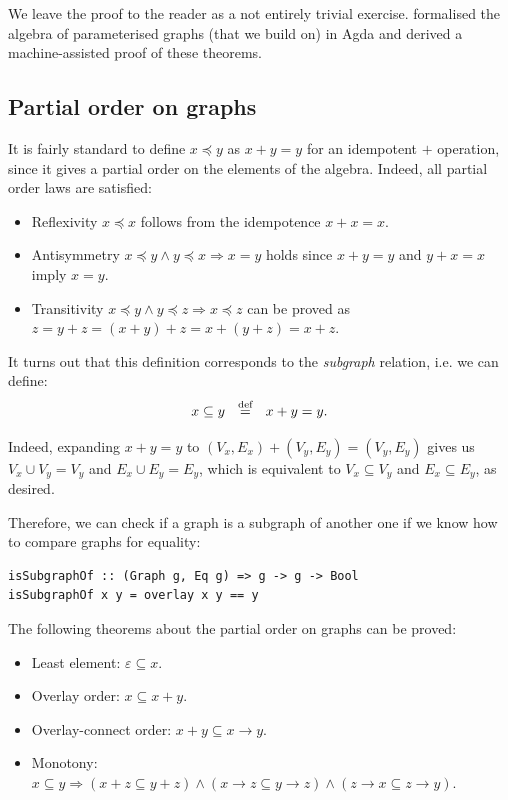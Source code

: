 We leave the proof to the reader as a not entirely trivial exercise.
\citet{2014_alekseyev_phd} formalised the algebra of
parameterised graphs (that we build on) in Agda and derived a
machine-assisted proof of these theorems.

\subsection{Partial order on graphs}\label{sub-partial-order}

It is fairly standard to define $x \preceq y$ as $x + y = y$ for an
idempotent $+$ operation, since it gives a partial order on the elements
of the algebra. Indeed, all partial order laws are satisfied:

\begin{itemize}
     \item Reflexivity $x \preceq x$ follows from the idempotence $x + x = x$.
     \item Antisymmetry $x \preceq y \wedge y \preceq x \Rightarrow x = y$ holds
     since $x + y = y$ and $y + x = x$ imply $x = y$.
     \item Transitivity $x \preceq y \wedge y \preceq z \Rightarrow x \preceq z$
     can be proved as $z = y + z = (x + y) + z = x + (y + z) = x + z$.
 \end{itemize}

\noindent
It turns out that this definition corresponds to the \emph{subgraph} relation,
i.e. we can define:
\[
x \subseteq y~~\stackrel{\text{def}}{=}~~x + y = y.
\]

\noindent
Indeed, expanding $x + y = y$ to $(V_x,E_x) + (V_y,E_y) = (V_y,E_y)$ gives us
$V_x \cup V_y = V_y$ and $E_x \cup E_y = E_y$, which is equivalent to
$V_x \subseteq V_y$ and $E_x \subseteq E_y$, as desired.

Therefore, we can check if a graph is a subgraph of another one if we know how to
compare graphs for equality:
\begin{verbatim}
isSubgraphOf :: (Graph g, Eq g) => g -> g -> Bool
isSubgraphOf x y = overlay x y == y
\end{verbatim}

The following theorems about the partial order on graphs can be proved:

\begin{itemize}
    \item Least element: $\varepsilon \subseteq x$.
    \item Overlay order: $x \subseteq x + y$.
    \item Overlay-connect order: $x + y \subseteq x \rightarrow y$.
    \item Monotony: $x \subseteq y \Rightarrow (x + z \subseteq y + z)
    \wedge (x \rightarrow z \subseteq y \rightarrow z)
    \wedge (z \rightarrow x \subseteq z \rightarrow y)$.

\end{itemize}

